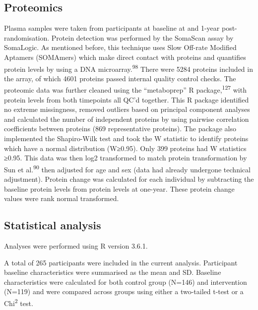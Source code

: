 \documentclass[11pt,twoside]{bristolthesis}
\begin{document}
\hypertarget{proteomics}{%
\subsection{Proteomics}\label{proteomics}}

Plasma samples were taken from participants at baseline at and 1-year post-randomisation. Protein detection was performed by the SomaScan assay by SomaLogic. As mentioned before, this technique uses Slow Off-rate Modified Aptamers (SOMAmers) which make direct contact with proteins and quantifies protein levels by using a DNA microarray.\textsuperscript{98} There were 5284 proteins included in the array, of which 4601 proteins passed internal quality control checks. The proteomic data was further cleaned using the ``metaboprep'' R package,\textsuperscript{127} with protein levels from both timepoints all QC'd together. This R package identified no extreme missingness, removed outliers based on principal component analyses and calculated the number of independent proteins by using pairwise correlation coefficients between proteins (869 representative proteins). The package also implemented the Shapiro-Wilk test and took the W statistic to identify proteins which have a normal distribution (W≥0.95). Only 399 proteins had W statistics ≥0.95. This data was then log2 transformed to match protein transformation by Sun et al.\textsuperscript{90} then adjusted for age and sex (data had already undergone technical adjustment). Protein change was calculated for each individual by subtracting the baseline protein levels from protein levels at one-year. These protein change values were rank normal transformed.

\hypertarget{statistical-analysis-2}{%
\subsection{Statistical analysis}\label{statistical-analysis-2}}

Analyses were performed using R version 3.6.1.

A total of 265 participants were included in the current analysis. Participant baseline characteristics were summarised as the mean and SD. Baseline characteristics were calculated for both control group (N=146) and intervention (N=119) and were compared across groups using either a two-tailed t-test or a Chi\textsuperscript{2} test.
\end{document}
